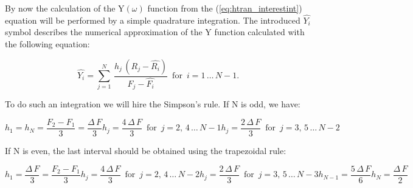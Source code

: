 \documentclass[12pt,twoside,a4paper]{article}
\numberwithin{equation}{subsection}
\numberwithin{figure}{subsection}
\begin{document}
By now the calculation of the $\mathrm{Y}(\omega )$ function from the (\ref{eq:htran_interestint}) equation will be performed by a simple
quadrature integration. The introduced $\widehat{Y_{i}}$ symbol describes the numerical approximation of the $\mathrm{Y}$ function
calculated with the following equation:

\begin{equation} \label{eq:htran_simplequadrature}
  \widehat{Y_{i}}=\sum_{j=1}^{N}\,\frac {{h_{j}}\,({R_{j}} - \widehat{R_{i}})}{{F_{j}} - \widehat{F_{i}}} \,\mbox{ for } \, i =
  1\,\ldots\,{N - 1} .
\end{equation}

To do such an integration we will hire the Simpson's rule. If N is odd, we have:

\begin{subequations} \label{eq:htran_nodd}
  \begin{equation}   \label{eq:hnodd_fnlast}
    {h_{1}} = {h_{N}} = \frac {F_2 - F_1}{3} = \frac {\Delta \,F}{3}
  \end{equation}
  \begin{equation}   \label{eq:hnodd_even}
    {h_{j}} = \frac {4\,\Delta \,F}{3}  \,\mbox{ for } \,j=2, \,4\,\ldots\,{N - 1}
  \end{equation}
  \begin{equation}   \label{eq:hnodd_odd}
    {h_{j}} = \frac {2\,\Delta \,F}{3}  \,\mbox{ for } \,j=3, \,5\,\ldots\,{N - 2}
  \end{equation}
\end{subequations}

If N is even, the last interval should be obtained using the trapezoidal rule:

\begin{subequations} \label{eq:htran_neven}
  \begin{equation}   \label{eq:hneven_first}
    {h_{1}} = \frac {\Delta \,F}{3} = \frac {F_2 - F_1}{3}
  \end{equation}
  \begin{equation}   \label{eq:hneven_even}
    {h_{j}}=\frac {4\,\Delta \,F}{3}  \,\mbox{ for } \,j=2, \,4\,\ldots\,{N - 2}
  \end{equation}
  \begin{equation}   \label{eq:hneven_odd}
    {h_{j}}=\frac {2\,\Delta \,F}{3}  \,\mbox{ for } \,j=3, \,5\,\ldots\,{N - 3}
  \end{equation}
   \begin{equation}   \label{eq:hneven_prelast}
    {h_{N - 1}} = \frac {5\,\Delta \,F}{6}
  \end{equation}
   \begin{equation}   \label{eq:hneven_last}
    {h_{N}} = \frac {\Delta \,F}{2}
  \end{equation}
\end{subequations}
\end{document}
